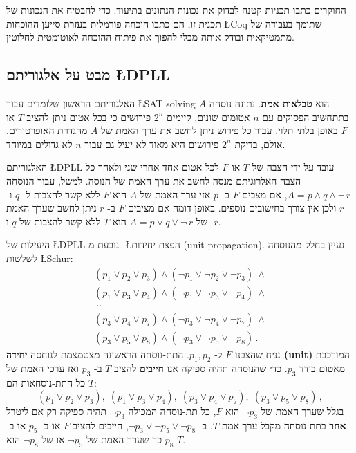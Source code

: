 החוקרים כתבו תכניות קטנה לבדוק את נכונות הנתונים בתיעוד. כדי להבטיח את הנכונות של תכנית זו, הם כתבו הוכחה פורמלית בעזרת סייען ההוכחות
\L{Coq}
שתומך בעבודה של מתמטיקאית ובודק אותה מבלי להפוך את פיתוח ההוכחה לאוטומטית לחלוטין.

\subsection{מבט על אלגוריתם \L{DPLL}}

האלגוריתם הראשון שלומדים עבור
\L{SAT solving}
הוא
\textbf{טבלאות אמת}.
נתונה נוסחה 
$A$
בתתחשיב הפסוקים עם 
$n$
אטומים שונים, קיימים
$2^n$
פירושים כי בכל אטום ניתן להציב
$T$
או
$F$
באופן בלתי תלוי. עבור כל פירוש ניתן לחשב את ערך האמת של
$A$
מהגדרת האופרטורים. אולם, בדיקת
$2^n$
פירושים היא מאוד לא יעיל גם עבור
$n$
לא גדולים במיוחד.

האלגוריתם
\L{DPLL}
עובד על ידי הצבה של
$T$
או
$F$
לכל אטום אחד אחרי שני ולאחר כל הצבה האלרוגיתם מנסה לחשב את ערך האמת של הנוסה. למשל, עבור הנוסחה
$A=p \wedge q \wedge \neg\, r$,
אם מצבים
$F$
ב-%
$p$
אזי ערך האמת של
$A$
הוא
$F$
ללא קשר להצבות ל-%
$q$
ו-%
$r$
ולכן אין צורך בחישובים נוספים. באופן דומה אם מציבים 
$F$
ב-%
$r$
ניתן לחשב שערך האמת של 
$A=p\vee q \vee \neg\, r$
הוא 
$T$
ללא קשר להצבות של
$q$
ו-%
$r$.

היעילות של
\L{DPLL}
נובעת מ-%
\L{הפצת יחידות (unit propagation)}.
נעיין בחלק מהנוסחה לשלשות
\L{Schur}:
\[
\begin{array}{l}\label{eq.schur3}
(p_1 \vee p_2 \vee p_3) \wedge (\neg p_1 \vee \neg p_2 \vee \neg p_3) \:\wedge \\
(p_1 \vee p_3 \vee p_4) \wedge (\neg p_1 \vee \neg p_3 \vee \neg p_4) \:\wedge \\
\cdots\\
(p_3 \vee p_4 \vee p_7) \wedge (\neg p_3 \vee \neg p_4 \vee \neg p_7) \:\wedge \\
(p_3 \vee p_5 \vee p_8) \wedge (\neg p_3 \vee \neg p_5 \vee \neg p_8)\,.
\end{array}
\]
נניח שהצבנו
$F$
ל-%
$p_1,p_2$.
התת-נוסחה הראשונה מצטמצמת לנוחסה
\textbf{יחידה (unit)}
המורכבת מאטום בודד
$p_3$.
כדי שהנוסחה תהיה ספיקה אנו
\textbf{חייבים}
להציב 
$T$
ב-%
$p_3$
ואז ערכי האמת של כל התת-נוסחאות הם
$T$:
\[
(p_1 \vee p_2 \vee p_3),\;(p_1 \vee p_3 \vee p_4),\;
(p_3 \vee p_4 \vee p_7),\;(p_3 \vee p_5 \vee p_8)\,,
\]
בגלל שערך האמת של
$\neg p_3$
הוא
$F$,
כל תת-נוסחה המכילה 
$\neg p_3$
תהיה ספיקה רק אם ליטרל
\textbf{אחר}
בתת-נוסחה מקבל ערך אמת
$T$.
ב-%
$\neg p_3 \vee \neg p_5 \vee \neg p_8$, 
חייבים להציב
$F$
או ב-%
$p_5$
או ב-%
$p_8$
כך שערך האמת של
$\neg p_5$
או של
$\neg p_8$
הוא
$T$.

